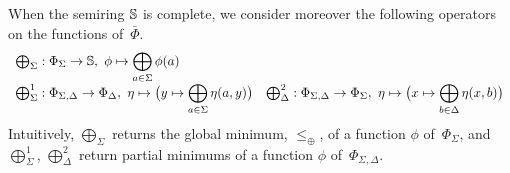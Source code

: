 
%
%
\noindent
When the semiring $\mathbb{S}$ is complete, we consider moreover 
the following operators on the functions of~$\bar\Phi$. %
\[
\begin{array}{ll}
\bigoplus_\Sigma : \Phi_\Sigma \to \Semiring,\
  \phi \mapsto \displaystyle\bigoplus_{a \in \Sigma} \phi(a)\\
%  
\bigoplus^1_\Sigma :
  \Phi_{\Sigma,\Delta} \to \Phi_\Delta,\
  \eta \mapsto \bigl( y \mapsto \displaystyle\bigoplus_{a \in \Sigma} \eta(a, y) \bigr) &
%
\bigoplus^2_\Delta :
  \Phi_{\Sigma,\Delta} \to \Phi_\Sigma,\
  \eta \mapsto \bigl( x \mapsto \displaystyle\bigoplus_{b \in \Delta} \eta(x, b) \bigr)\\
\end{array}
\]
Intuitively, $\bigoplus_\Sigma$
returns the global minimum, \wrt $\leq_\oplus$, of a function $\phi$ of~$\Phi_\Sigma$,
and $\bigoplus^1_\Sigma$, $\bigoplus^2_\Delta$ return partial minimums of 
a function $\phi$ of~$\Phi_{\Sigma,\Delta}$.

